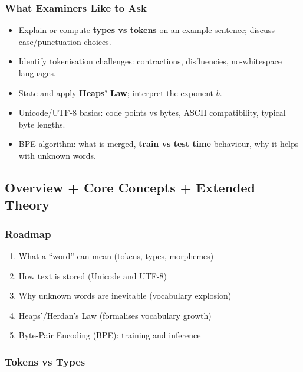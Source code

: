 \separator

\subsubsection*{What Examiners Like to Ask}

\begin{itemize}
  \item Explain or compute \textbf{types vs tokens} on an example sentence; discuss case/punctuation choices.
  \item Identify tokenisation challenges: contractions, disfluencies, no-whitespace languages.
  \item State and apply \textbf{Heaps' Law}; interpret the exponent $b$.
  \item Unicode/UTF-8 basics: code points vs bytes, ASCII compatibility, typical byte lengths.
  \item BPE algorithm: what is merged, \textbf{train vs test time} behaviour, why it helps with unknown words.
\end{itemize}

\separator

\subsection{Overview + Core Concepts + Extended Theory}

\subsubsection*{Roadmap}
\begin{enumerate}
  \item What a ``word'' can mean (tokens, types, morphemes)
  \item How text is stored (Unicode and UTF-8)
  \item Why unknown words are inevitable (vocabulary explosion)
  \item Heaps'/Herdan's Law (formalises vocabulary growth)
  \item Byte-Pair Encoding (BPE): training and inference
\end{enumerate}

\bigseparator

\subsubsection{Tokens vs Types}

